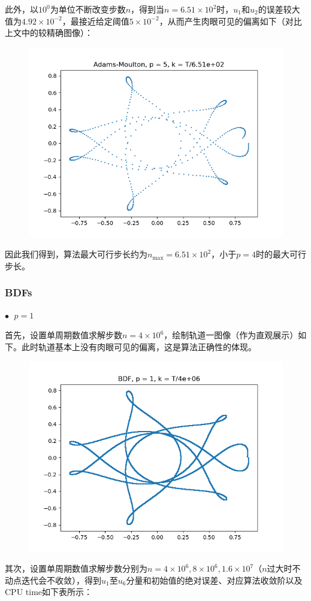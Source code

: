 \documentclass{ctexart}
\begin{document}
\begin{sloppypar}
此外，以$10^0$为单位不断改变步数$n$，得到当$n = 6.51 \times 10^2$时，$u_1$和$u_2$的误差较大值为$4.92 \times 10^{-2}$，最接近给定阈值$5 \times 10^{-2}$，从而产生肉眼可见的偏离如下（对比上文中的较精确图像）：
\begin{figure}[H]
\centering
\includegraphics[scale = 0.45]{./report_src/Figure_55.png}
\end{figure}
因此我们得到，算法最大可行步长约为$n_{\max} = 6.51 \times 10^2$，小于$p=4$时的最大可行步长。

\subsubsection{BDFs}
$\bullet \;$ $p = 1$

首先，设置单周期数值求解步数$n = 4 \times 10^6$，绘制轨道一图像（作为直观展示）如下。此时轨道基本上没有肉眼可见的偏离，这是算法正确性的体现。
\begin{figure}[H]
\centering
\includegraphics[scale = 0.45]{./report_src/Figure_56.png}
\end{figure}
其次，设置单周期数值求解步数分别为$n = 4 \times 10^6,8 \times 10^6, 1.6 \times 10^7$（$n$过大时不动点迭代会不收敛），得到$u_1$至$u_6$分量和初始值的绝对误差、对应算法收敛阶以及CPU time如下表所示：


\end{sloppypar}
\end{document}
